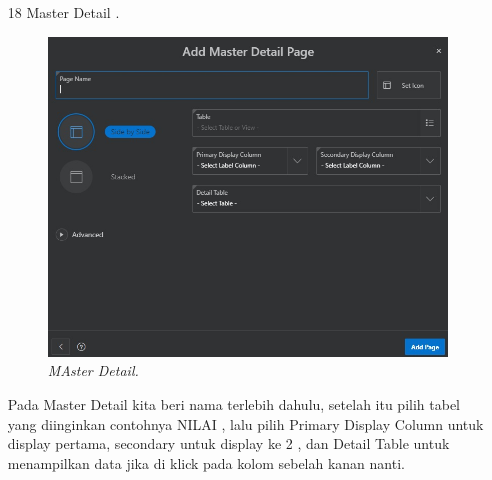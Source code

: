 \begin{enumerate}
\item[18]Master Detail .
\begin{figure}[!htbp]
    \begin{center}
    \includegraphics[scale=0.7]{figures/master_dtl.jpg}
    \caption{\textit{MAster Detail.}}
    \end{center}
\end{figure}
\par Pada Master Detail kita beri nama terlebih dahulu, setelah itu pilih tabel yang diinginkan contohnya NILAI , lalu pilih Primary Display Column untuk display pertama, secondary untuk display ke 2 , dan Detail Table untuk menampilkan data jika di klick pada kolom sebelah kanan nanti.


\end{enumerate}
